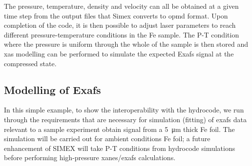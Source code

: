  The pressure, temperature, density and velocity can all be obtained at a given
 time step from the output files that Simex converts to opmd format. Upon
 completion of the code, it is then possible to adjust laser parameters to reach
 different pressure-temperature conditions in the Fe sample. The P-T condition
 where the pressure is uniform through the whole of the sample is then stored and
 \gls{xas} modelling can be performed to simulate the expected E\gls{xafs} signal at
 the compressed state.
%
\begin{figure}
  \label{fig:hydro}
\end{figure}
%
\subsection{Modelling of E\gls{xafs}}
In this simple example, to show the interoperability with the hydrocode,
we run through the requirements that are necessary for
simulation (fitting) of \gls{exafs} data relevant to a sample experiment obtain signal
from a \SI{5}{\micro\metre} thick Fe foil. The simulation will be carried out for
ambient conditions Fe foil; a future enhancement of SIMEX will take P-T
conditions from hydrocode simulations before performing high-pressure
\gls{xanes}/\gls{exafs} calculations.


